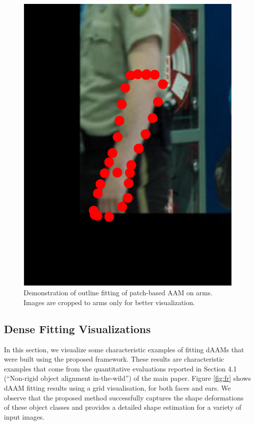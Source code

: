 \begin{figure}[!t]
    \includegraphics[height=\ofh]{resources/Suplementory_Meterial/ExFit/0044.eps}
    \caption{Demonstration of outline fitting of patch-based AAM on arms. Images are cropped to arms only for better visualization.}
    \label{fig:paam_fittingresults}
\end{figure}


\subsection{Dense Fitting Visualizations}
\label{sec:daam_fittingresults}


In this section, we visualize some characteristic examples of fitting
dAAMs that were built using the proposed framework. These results are characteristic examples that come from the quantitative evaluations reported in Section 4.1 (``Non-rigid object alignment in-the-wild'') of the main paper. Figure \ref{fig:fr} shows dAAM fitting results using a grid visualisation, for both faces and ears. We observe that the proposed method successfully captures the shape deformations of these object classes and provides a detailed shape estimation for a variety of input images.


